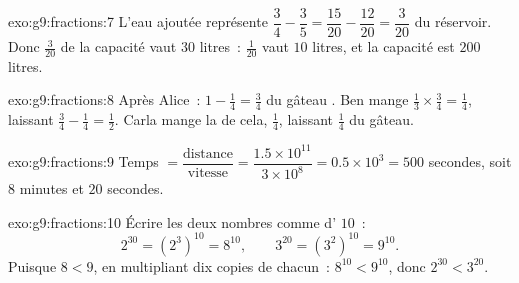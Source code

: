 \begin{solution}{exo:g9:fractions:7}
L'eau ajoutée représente
$\dfrac34 - \dfrac35 = \dfrac{15}{20} - \dfrac{12}{20} = \dfrac{3}{20}$
du réservoir. Donc $\frac{3}{20}$ de la capacité vaut $30$ litres~:
$\frac{1}{20}$ vaut $10$ litres, et la capacité est $200$ litres.
\end{solution}

\begin{solution}{exo:g9:fractions:8}
Après Alice~: $1 - \frac14 = \frac34$ du gâteau . Ben mange
$\frac13 \times \frac34 = \frac14$, laissant
$\frac34 - \frac14 = \frac12$. Carla mange la  de cela,
$\frac14$, laissant $\frac14$ du gâteau.
\end{solution}

\begin{solution}{exo:g9:fractions:9}
Temps $= \dfrac{\text{distance}}{\text{vitesse}} =
\dfrac{1.5 \times 10^{11}}{3 \times 10^8} = 0.5 \times 10^3 = 500$
secondes, soit $8$ minutes et $20$ secondes.
\end{solution}

\begin{solution}{exo:g9:fractions:10}
Écrire les deux nombres comme  d' $10$~:
\[
2^{30} = \left(2^3\right)^{10} = 8^{10},
\qquad
3^{20} = \left(3^2\right)^{10} = 9^{10}.
\]
Puisque $8 < 9$, en multipliant dix copies de chacun~: $8^{10} <
9^{10}$, donc $2^{30} < 3^{20}$.
\end{solution}

